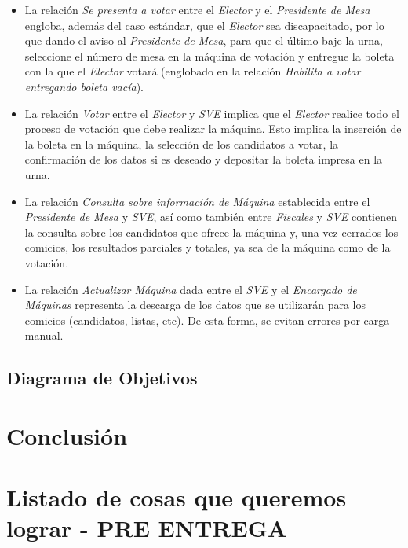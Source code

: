 \documentclass[spanish, 10pt,a4paper]{article}
\numberwithin{equation}{section} %
\begin{document}
\begin{itemize}
\item La relación \textit{Se presenta a votar} entre el \textit{Elector} y el \textit{Presidente de Mesa} engloba, además del caso estándar, que el \textit{Elector} sea discapacitado, por lo que dando el aviso al \textit{Presidente de Mesa}, para que el último baje la urna, seleccione el número de mesa en la máquina de votación y entregue la boleta con la que el \textit{Elector} votará (englobado en la relación \textit{Habilita a votar entregando boleta vacía}).
\item La relación \textit{Votar} entre el \textit{Elector} y \textit{SVE} implica que el \textit{Elector} realice todo el proceso de votación que debe realizar la máquina. Esto implica la inserción de la boleta en la máquina, la selección de los candidatos a votar, la confirmación de los datos si es deseado y depositar la boleta impresa en la urna.
\item La relación \textit{Consulta sobre información de Máquina} establecida entre el \textit{Presidente de Mesa} y \textit{SVE}, así como también entre \textit{Fiscales} y \textit{SVE} contienen la consulta sobre los candidatos que ofrece la máquina y, una vez cerrados los comicios, los resultados parciales y totales, ya sea de la máquina como de la votación.
\item La relación \textit{Actualizar Máquina} dada entre el \textit{SVE} y el \textit{Encargado de Máquinas} representa la descarga de los datos que se utilizarán para los comicios (candidatos, listas, etc). De esta forma, se evitan errores por carga manual.
\end{itemize}

\subsection{Diagrama de Objetivos}

\newpage
\section{Conclusión}
	\newpage

\newpage
\section{Listado de cosas que queremos lograr - PRE ENTREGA}
\end{document}
